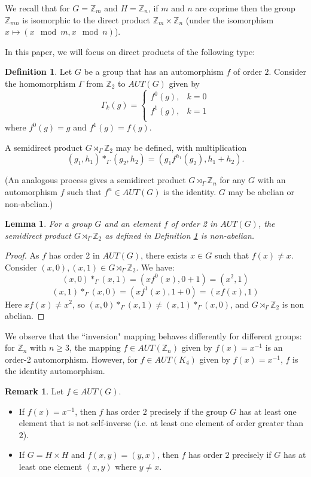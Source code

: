\documentclass[12pt, a4paper]{article}
\newtheorem{lemma}[theorem]{Lemma}
\theoremstyle{definition}
\newtheorem{definition}[theorem]{Definition}
\newtheorem{remark}[theorem]{Remark}
\begin{document}
We recall that for $G=\mathbb{Z}_m$ and $H=\mathbb{Z}_n$, if $m$ and $n$ are coprime then the group $\mathbb{Z}_{mn}$ is isomorphic to the direct product $\mathbb{Z}_m \times \mathbb{Z}_n$ (under the isomorphism $x \mapsto (x \mod m, x \mod n)$).

In this paper, we will focus on direct products of the following type:
\begin{definition}\label{def:GxZ_2}
Let $G$ be a group that has an automorphism $f$ of order $2$.  Consider the homomorphism $\Gamma$ from $\mathbb{Z}_2$ to $AUT(G)$ given by
\[
    \Gamma_k(g) = \begin{cases} 
           f^0(g), & k=0 \\
           f^1(g), & k=1\\
    \end{cases}
    \]
where $f^0(g)=g$ and $f^1(g)=f(g)$.

A semidirect product $G \rtimes_{\Gamma} \mathbb{Z}_2$ may be defined, with multiplication
\[ (g_1,h_1)*_{\Gamma}(g_2,h_2)=(g_1 f^{h_1}(g_2),h_1+h_2).\]
\end{definition}

(An analogous process gives a semidirect product $G \rtimes_{\Gamma} \mathbb{Z}_n$ for any $G$ with an automorphism $f$ such that $f^n \in AUT(G)$ is the identity.  $G$ may be abelian or non-abelian.)


\begin{lemma}\label{lem:nonabelian}
For a group $G$ and an element $f$ of order 2 in $AUT(G)$, the semidirect product $G \rtimes_{\Gamma} \mathbb{Z}_2$ as defined in Definition \ref{def:GxZ_2}  is non-abelian.
\end{lemma}
\begin{proof}
As $f$ has order 2 in $AUT(G)$, there exists $x \in G$ such that $f(x) \neq x$. Consider $(x,0),(x,1) \in G \rtimes_\Gamma \mathbb{Z}_2$. We have:
    \[(x,0) *_\Gamma(x,1)=(xf^0(x),0+1) = (x^2,1)\]
    \[(x,1) *_\Gamma(x,0)=(xf^1(x),1+0) = (xf(x),1)\]
 Here $xf(x) \neq x^2$, so \label{ex:GxZ_2} $(x,0) *_\Gamma(x,1) \neq (x,1) *_\Gamma(x,0)$, and $G \rtimes_{\Gamma} \mathbb{Z}_2$ is non abelian.
\end{proof}
We observe that the ``inversion" mapping behaves differently for different groups: for $\mathbb{Z}_n$ with $ n \geq 3$, the mapping $f\in AUT(\mathbb{Z}_n)$ given by $f(x) = x^{-1}$ is an order-2 automorphism. However, for $f \in AUT(K_4)$ given by $f(x)=x^{-1}$, $f$ is the identity automorphism.
\begin{remark}
Let $f \in AUT(G)$.
\begin{itemize}
\item If $f(x) = x^{-1}$, then $f$ has order $2$ precisely if the group $G$ has at least one element that is not self-inverse (i.e. at least one element of order greater than $2$).
\item If $G=H \times H$ and $f(x,y) = (y,x)$, then $f$ has order $2$ precisely if $G$ has at least one element $(x,y)$ where $y \neq x$.
\end{itemize}
\end{remark}
\end{document}
